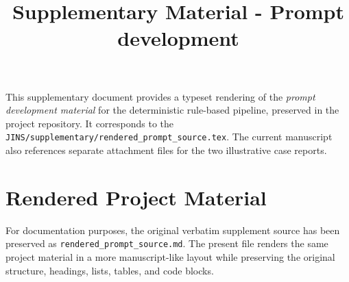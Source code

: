 \documentclass[11pt]{article}
\title{Supplementary Material - Prompt development}
\author{}
\date{}
\begin{document}
\maketitle

\noindent This supplementary document provides a typeset rendering of the {\it prompt development material} for the deterministic rule-based pipeline, preserved in the project repository. It corresponds to the \texttt{JINS/supplementary/rendered\_prompt\_source.tex}. The current manuscript also references separate attachment files for the two illustrative case reports.

\section*{Rendered Project Material}

\noindent For documentation purposes, the original verbatim supplement source has been preserved as \texttt{rendered\_prompt\_source.md}. The present file renders the same project material in a more manuscript-like layout while preserving the original structure, headings, lists, tables, and code blocks.


\end{document}

